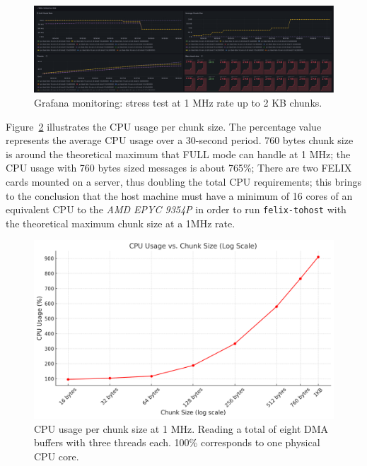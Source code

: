 \begin{figure}
\centering
\includegraphics[width=\textwidth]{images/results/tohost-perf-2k.png}
\caption{Grafana monitoring: stress test at 1 MHz rate up to 2 KB chunks.}
\label{fig:tohost-perf-2k}
\end{figure}

Figure~\ref{fig:cpu-usage} illustrates the CPU usage per chunk size. The percentage value represents the average CPU usage over a 30-second period. 760 bytes chunk size is around the theoretical maximum that FULL mode can handle at 1 MHz; the CPU usage with 760 bytes sized messages is about 765\%; There are two \acs{FELIX} cards mounted on a server, thus doubling the total CPU requirements; this brings to the conclusion that the host machine must have a minimum of 16 cores of an equivalent CPU to the \emph{AMD EPYC 9354P} in order to run \texttt{felix-tohost} with the theoretical maximum chunk size at a 1MHz rate.

\begin{figure}[htbp]
\centering
\includegraphics[width=\textwidth]{images/results/cpu-usage-chunk-size-1MHz.png}
\caption[CPU usage per chunk size at 1 MHz]{CPU usage per chunk size at 1 MHz. Reading a total of eight DMA buffers with three threads each. 100\% corresponds to one physical CPU core.}
\label{fig:cpu-usage}
\end{figure}

